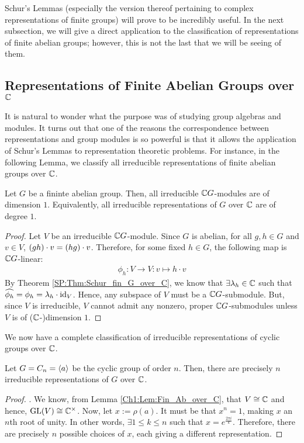 Schur's Lemmas (especially the version thereof pertaining to complex representations of finite groups) will prove to be incredibly useful. In the next subsection, we will give a direct application to the classification of representations of finite abelian groups; however, this is not the last that we will be seeing of them.

\subsection{Representations of Finite Abelian Groups over $\mathbb{C}$}

It is natural to wonder what the purpose was of studying group algebras and modules. It turns out that one of the reasons the correspondence between representations and group modules is so powerful is that it allows the application of Schur's Lemmas to representation theoretic problems. For instance, in the following Lemma, we classify all irreducible representations of finite abelian groups over $\mathbb{C}$.

\begin{lemma} \label{Ch1:Lem:Fin_Ab_over_C}
    Let $G$ be a fininte abelian group. Then, all irreducible $\mathbb{C} G$-modules are of dimension $1$. Equivalently, all irreducible representations of $G$ over $\mathbb{C}$ are of degree $1$.
\end{lemma}
\begin{proof}
    Let $V$ be an irreducible $\mathbb{C} G$-module. Since $G$ is abelian, for all $g,h \in G$ and $v \in V$, $\left( gh \right) \cdot v = \left( hg \right) \cdot v$. Therefore, for some fixed $h \in G$, the following map is $\mathbb{C} G$-linear:
    \begin{align*}
        \phi_h : V \to V : v \mapsto h \cdot v
    \end{align*}
    By Theorem \ref{SP:Thm:Schur_fin_G_over_C}, we know that $\exists \lambda_h \in \mathbb{C}$ such that $\widehat{\phi_h} = \phi_h = \lambda_h \cdot \operatorname{id}_V$. Hence, any subspace of $V$ must be a $\mathbb{C} G$-submodule. But, since $V$ is irreducible, $V$ cannot admit any nonzero, proper $\mathbb{C} G$-submodules unless $V$ is of ($\mathbb{C}$-)dimension $1$.
\end{proof}
We now have a complete classification of irreducible representations of cyclic groups over $\mathbb{C}$.
\begin{corollary}\label{Ch1:Cor:Irr_Cycl}
    Let $G = C_n = \left\langle a \right\rangle$ be the cyclic group of order $n$. Then, there are precisely $n$ irreducible representations of $G$ over $\mathbb{C}$.
    \begin{proof}
        . We know, from Lemma \ref{Ch1:Lem:Fin_Ab_over_C}, that $V \cong \mathbb{C}$ and hence, $\operatorname{GL}\!\left( V \right) \cong \mathbb{C}^\times$. Now, let $x := \rho(a)$. It must be that $x^n = 1$, making $x$ an $n$th root of unity. In other words, $\exists 1 \leq k \leq n$ such that $x = e^{\frac{2\pi i}{k}}$. Therefore, there are precisely $n$ possible choices of $x$, each giving a different representation.
    \end{proof}
\end{corollary}

